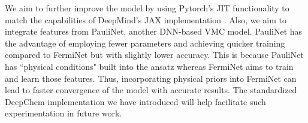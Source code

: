 \documentclass[letterpaper]{article} %
\begin{document}
We aim to further improve the model by using Pytorch's JIT functionality to match the capabilities of DeepMind's JAX implementation \cite{spencer2020better}. Also, we aim to integrate features from PauliNet\cite{10.1063/5.0157512}, another DNN-based VMC model. PauliNet has the advantage of employing fewer parameters and achieving quicker training compared to FermiNet but with slightly lower accuracy. This is because PauliNet has ``physical conditions" built into the ansatz whereas FermiNet aims to train and learn those features. Thus, incorporating physical priors into FermiNet can lead to faster convergence of the model with accurate results. The standardized DeepChem implementation we have introduced will help facilitate such experimentation in future work.


\appendix
%

\end{document}

